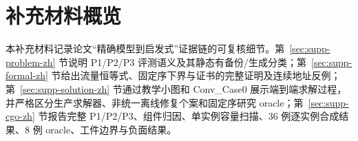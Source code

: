 \section*{补充材料概览}
本补充材料记录论文“精确模型到启发式”证据链的可复核细节。第~\ref{sec:supp-problem-zh} 节说明 P1/P2/P3 评测语义及其静态有备份/生成分类；第~\ref{sec:supp-formal-zh} 节给出流量恒等式、固定序下界与证书的完整证明及连续地址反例；第~\ref{sec:supp-solution-zh} 节通过教学小图和 Conv\_Case0 展示端到端求解过程，并严格区分生产求解器、非统一离线修复个案和固定序研究 oracle；第~\ref{sec:supp-cgo-zh} 节报告完整 P1/P2/P3、组件归因、单实例容量扫描、36 例逐实例合成结果、8 例 oracle、工件边界与负面结果。

